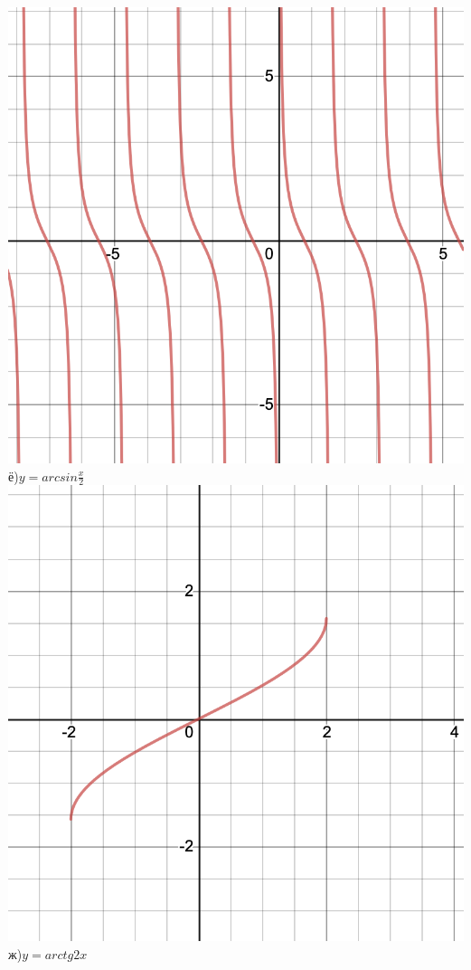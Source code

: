 \documentclass[a4paper]{article}
\begin{document}
    \includegraphics[scale=0.1]{f}\\
    ё)$y=arcsin\frac{x}{2}$
    \includegraphics[scale=0.1]{g}
    ж)$y=arctg2x$
\end{document}
